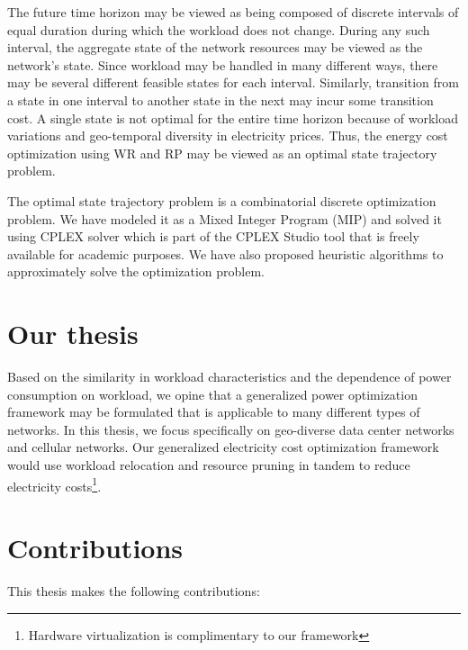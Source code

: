 The future time horizon may be viewed as being composed of discrete intervals of equal duration during which the workload does not change. During any such interval, the aggregate state of the network resources may be viewed as the network's state. Since workload may be handled in many different ways, there may be several different feasible states for each interval. Similarly, transition from a state in one interval to another state in the next may incur some transition cost. A single state is not optimal for the entire time horizon because of workload variations and geo-temporal diversity in electricity prices. Thus, the energy cost optimization using WR and RP may be viewed as an optimal state trajectory problem.

The optimal state trajectory problem is a combinatorial discrete optimization problem. We have modeled it as a Mixed Integer Program (MIP) and solved it using CPLEX solver which is part of the CPLEX Studio tool that is freely available for academic purposes. We have also proposed heuristic algorithms to approximately solve the optimization problem.

\section{Our thesis} Based on the similarity in workload characteristics and the dependence of power consumption on workload, we opine that a generalized power optimization framework may be formulated that is applicable to many different types of networks. In this thesis, we focus specifically on geo-diverse data center networks and cellular networks. Our generalized electricity cost optimization framework would use workload relocation and resource pruning in tandem to reduce electricity costs\footnote{Hardware virtualization is complimentary to our framework}. 

\section{Contributions} This thesis makes the following contributions:

